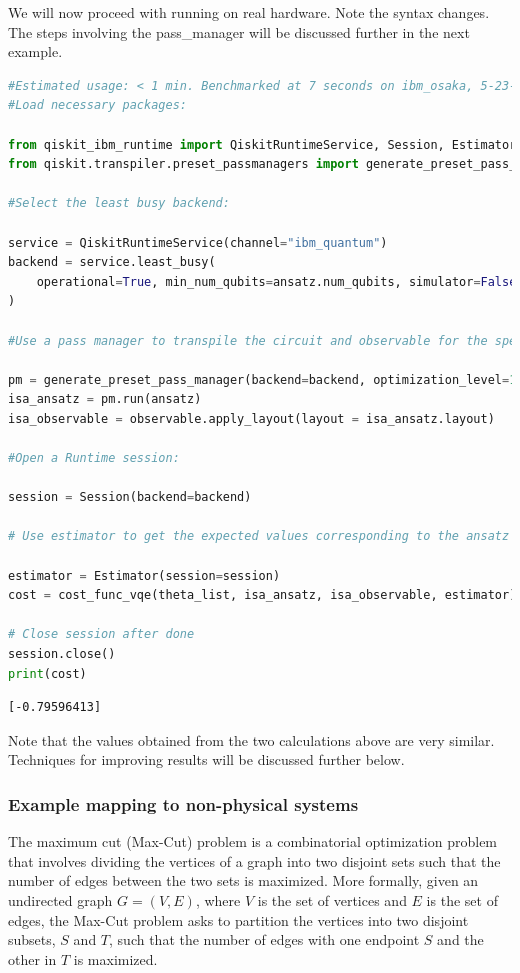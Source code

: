 \documentclass[12pt, oneside]{book}
\theoremstyle{definition}
\theoremstyle{definition}
\theoremstyle{remark}
\begin{document}
We will now proceed with running on real hardware. Note the syntax changes. The steps involving the pass\_manager will be discussed further in the next example.

\begin{lstlisting}[language=Python]
#Estimated usage: < 1 min. Benchmarked at 7 seconds on ibm_osaka, 5-23-24
#Load necessary packages:

from qiskit_ibm_runtime import QiskitRuntimeService, Session, EstimatorV2 as Estimator
from qiskit.transpiler.preset_passmanagers import generate_preset_pass_manager

#Select the least busy backend:

service = QiskitRuntimeService(channel="ibm_quantum")
backend = service.least_busy(
    operational=True, min_num_qubits=ansatz.num_qubits, simulator=False
)

#Use a pass manager to transpile the circuit and observable for the specific backend being used:

pm = generate_preset_pass_manager(backend=backend, optimization_level=1)
isa_ansatz = pm.run(ansatz)
isa_observable = observable.apply_layout(layout = isa_ansatz.layout)

#Open a Runtime session:

session = Session(backend=backend)

# Use estimator to get the expected values corresponding to the ansatz

estimator = Estimator(session=session)
cost = cost_func_vqe(theta_list, isa_ansatz, isa_observable, estimator)

# Close session after done
session.close()
print(cost)
\end{lstlisting}
\begin{lstlisting}
[-0.79596413]
\end{lstlisting}

Note that the values obtained from the two calculations above are very similar. Techniques for improving results will be discussed further below.

\subsubsection{Example mapping to non-physical systems}
The maximum cut (Max-Cut) problem is a combinatorial optimization problem that involves dividing the vertices of a graph into two disjoint sets such that the number of edges between the two sets is maximized. More formally, given an undirected graph $G=(V,E)$, where $V$ is the set of vertices and $E$ is the set of edges, the Max-Cut problem asks to partition the vertices into two disjoint subsets, $S$ and $T$, such that the number of edges with one endpoint $S$ and the other in $T$ is maximized.
\end{document}
